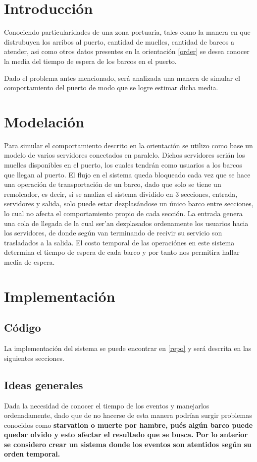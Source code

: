 

\section{Introducci\'on}
	Conociendo particularidades de una zona portuaria, tales como la manera
	en que distrubuyen los arribos al puerto, cantidad de muelles, cantidad de
	barcos a atender, asi como otros datos presentes en la orientaci\'on \ref{order}
	se desea conocer la media del tiempo de espera de los barcos en el puerto.

	Dado el problema antes mencionado, ser\'a analizada una manera de simular
	el comportamiento del puerto de modo que se logre estimar dicha media.

\section{Modelaci\'on}
	Para simular el comportamiento descrito en la orientaci\'on se utilizo como
	base un modelo de varios servidores conectados en paralelo. Dichos servidores
	seri\'an los muelles disponibles en el puerto, los cuales tendr\'an como usuarios 
	a los barcos que llegan al puerto. 
	El flujo en el sistema queda bloqueado cada vez que se hace una operaci\'on de 
	transportaci\'on de un barco, dado que solo se tiene un remolcador, es decir, si se 
	analiza el sistema dividido en 3 secciones, entrada, servidores y salida, solo puede 
	estar dezplas\'andose un \'unico barco entre secciones, lo cual no afecta el comportamiento
	propio de cada secci\'on.
	La entrada genera una cola de llegada de la cual ser'an dezplasados ordenamente los
	usuarios hacia los servidores, de donde seg\'un van terminando de recivir su servicio
	son trasladados a la salida. 
	El costo temporal de las operaci\'ones en este sistema determina el tiempo de espera 
	de cada barco y por tanto nos permitira hallar media de espera.

\section{Implementaci\'on}
	\subsection{C\'odigo}
		La implementaci\'on del sistema se puede encontrar en \ref{repo} y ser\'a descrita
		en las siguientes secciones.

	\subsection{Ideas generales}
		Dada la necesidad de conocer el tiempo de los eventos y manejarlos ordenadamente, dado que de
		no hacerse de esta manera podr\'ian surgir problemas conocidos como \bf{starvation} o 
		\bf{muerte por hambre}, pu\'es alg\'un barco puede quedar olvido y esto afectar el resultado 
		que se busca. Por lo anterior se considero crear un sistema donde los eventos son atentidos 
		seg\'un su orden temporal.

